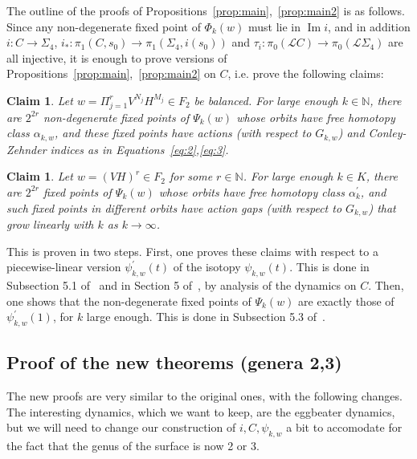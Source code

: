 \documentclass[11pt]{article}
\newtheorem{claim}[theorem]{Claim}
\newcommand{\N}{\mathbb{N}}
\DeclareMathOperator{\Ima}{Im}
\begin{document}
            The outline of the proofs of Propositions~\ref{prop:main},~\ref{prop:main2} is as follows. Since any non-degenerate fixed point of $\Phi_k(w)$ must lie in $\Ima i$, and in addition $i: C \to \Sigma_4$, $i_*: \pi_1(C,s_0) \to \pi_1(\Sigma_4,i(s_0))$ and $\tau_i: \pi_0(\mathscr{L}C) \to \pi_0(\mathscr{L}\Sigma_4)$ are all injective, it is enough to prove versions of Propositions~\ref{prop:main},~\ref{prop:main2} on $C$, i.e. prove the following claims:
            \begin{claim}
            \label{cl:2}
                Let $w = \Pi_{j=1}^r V^{N_j} H^{M_j} \in F_2$ be balanced. For large enough $k \in \N$, there are $2^{2r}$ non-degenerate fixed points of $\Psi_k(w)$ whose orbits have free homotopy class $\alpha_{k,w}$, and these fixed points have actions (with respect to $G_{k,w}$) and Conley-Zehnder indices as in Equations~\ref{eq:2},\ref{eq:3}.
            \end{claim}
            
            \begin{claim}
            \label{cl:2.2}
                Let $w = (VH)^r \in F_2$ for some $r \in \N$. For large enough $k \in K$, there are $2^{2r}$ fixed points of $\Psi_k(w)$ whose orbits have free homotopy class $\alpha_k^\prime$, and such fixed points in different orbits have action gaps (with respect to $G_{k,w}$) that grow linearly with $k$ as $k \to \infty$.
            \end{claim}
            
            This is proven in two steps. First, one proves these claims with respect to a piecewise-linear version $\psi_{k,w}^\prime(t)$ of the isotopy $\psi_{k,w}(t)$. This is done in Subsection 5.1 of~\cite{10} and in Section 5 of~\cite{PS14}, by analysis of the dynamics on $C$. Then, one shows that the non-degenerate fixed points of $\Psi_k(w)$ are exactly those of $\psi_{k,w}^\prime(1)$, for $k$ large enough. This is done in Subsection 5.3 of~\cite{10}.
    
    \subsection{Proof of the new theorems (genera 2,3)}
    \label{sec:3.2}
        The new proofs are very similar to the original ones, with the following changes. The interesting dynamics, which we want to keep, are the eggbeater dynamics, but we will need to change our construction of $i, C, \psi_{k,w}$ a bit to accomodate for the fact that the genus of the surface is now 2 or 3.
        
\end{document}
